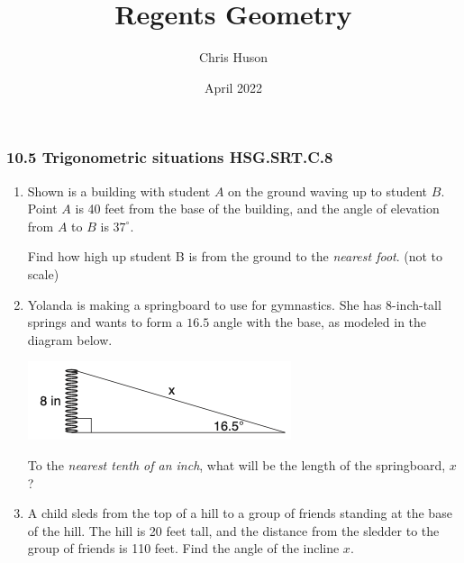 \documentclass[12pt, twoside]{article}
\title{Regents Geometry}
\author{Chris Huson}
\date{April 2022}
\begin{document}
\subsubsection*{10.5 Trigonometric situations \hfill HSG.SRT.C.8}
\begin{enumerate}
\item Shown is a building with student $A$ on the ground waving up to student $B$. Point $A$ is 40 feet from the base of the building, and the angle of elevation from $A$ to $B$ is $37^\circ$.

Find how high up student B is from the ground to the \emph{nearest foot}. \hfill (not to scale)
  \begin{flushright}
    \end{flushright}

\item Yolanda is making a springboard to use for gymnastics. She has 8-inch-tall springs and wants to form a $16.5$ angle with the base, as modeled in the diagram below.
\begin{center}
  \includegraphics[scale=0.6]{trig-spring.png}
\end{center}
To the \emph{nearest tenth of an inch}, what will be the length of the springboard, $x$? \vspace{4cm}

\item A child sleds from the top of a hill to a group of friends standing at the base of the hill. The hill is 20 feet tall, and the distance from the sledder to the group of friends is 110 feet. Find the angle of the incline $x$.
\begin{flushright}
\end{flushright}\vspace{4cm}
  

\end{enumerate}
\end{document}
